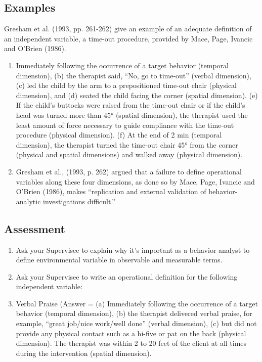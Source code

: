 \subsection{Examples}
Gresham et al. (1993, pp. 261-262) give an example of an adequate definition of an independent variable, a time-out procedure, provided by Mace, Page, Ivancic and O'Brien (1986).
\begin{enumerate}
\item Immediately following the occurrence of a target behavior (temporal dimension), (b) the therapist said, ``No, go to time-out'' (verbal dimension), (c) led the child by the arm to a prepositioned time-out chair (physical dimension), and (d) seated the child facing the corner (spatial dimension). (e) If the child's buttocks were raised from the time-out chair or if the child's head was turned more than 45° (spatial dimension), the therapist used the least amount of force necessary to guide compliance with the time-out procedure (physical dimension). (f) At the end of 2 min (temporal dimension), the therapist turned the time-out chair 45° from the corner (physical and spatial dimensions) and walked away (physical dimension).
\item Gresham et al., (1993, p. 262) argued that a failure to define operational variables along these four dimensions, as done so by Mace, Page, Ivancic and O'Brien (1986), makes ``replication and external validation of behavior-analytic investigations difficult.''
\end{enumerate}
%
\subsection{Assessment}
\begin{enumerate}
\item Ask your Supervisee to explain why it's important as a behavior analyst to define environmental variable in observable and measurable terms. 
\item Ask your Supervisee to write an operational definition for the following independent variable:
\item Verbal Praise (Answer = (a) Immediately following the occurrence of a target behavior (temporal dimension), (b) the therapist delivered verbal praise, for example, ``great job/nice work/well done'' (verbal dimension), (c) but did not provide any physical contact such as a hi-five or pat on the back (physical dimension). The therapist was within 2 to 20 feet of the client at all times during the intervention (spatial dimension).
\end{enumerate}
%
